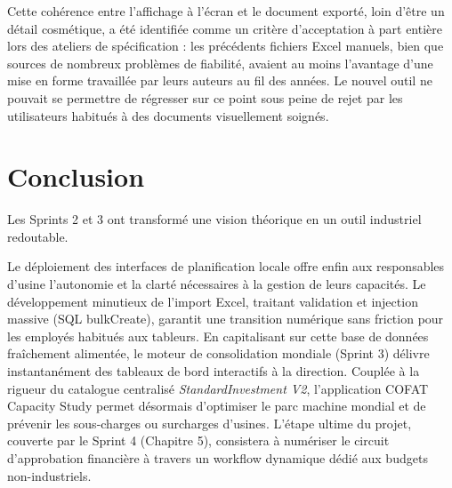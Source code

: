 Cette cohérence entre l'affichage à l'écran et le document exporté, loin d'être un détail cosmétique, a été identifiée comme un critère d'acceptation à part entière lors des ateliers de spécification : les précédents fichiers Excel manuels, bien que sources de nombreux problèmes de fiabilité, avaient au moins l'avantage d'une mise en forme travaillée par leurs auteurs au fil des années. Le nouvel outil ne pouvait se permettre de régresser sur ce point sous peine de rejet par les utilisateurs habitués à des documents visuellement soignés.

\section{Conclusion}
Les Sprints 2 et 3 ont transformé une vision théorique en un outil industriel redoutable.

 Le déploiement des interfaces de planification locale offre enfin aux responsables d'usine l'autonomie et la clarté nécessaires à la gestion de leurs capacités. Le développement minutieux de l'import Excel, traitant validation et injection massive (SQL bulkCreate), garantit une transition numérique sans friction pour les employés habitués aux tableurs.
En capitalisant sur cette base de données fraîchement alimentée, le moteur de consolidation mondiale (Sprint 3) délivre instantanément des tableaux de bord interactifs à la direction. Couplée à la rigueur du catalogue centralisé \textit{StandardInvestment V2}, l'application COFAT Capacity Study permet désormais d'optimiser le parc machine mondial et de prévenir les sous-charges ou surcharges d'usines.
L'étape ultime du projet, couverte par le Sprint 4 (Chapitre 5), consistera à numériser le circuit d'approbation financière à travers un workflow dynamique dédié aux budgets non-industriels.